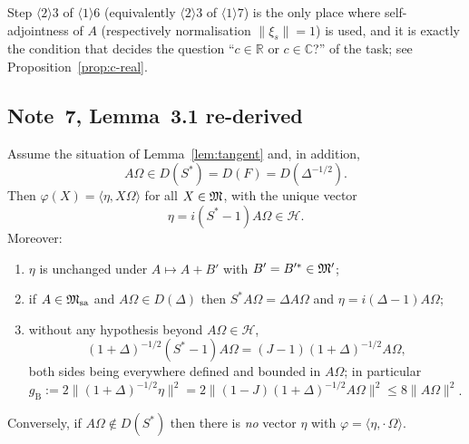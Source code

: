 \documentclass[11pt]{article}
\newcommand{\Om}{\Omega}
\newcommand{\Hil}{\mathcal H}
\newcommand{\Msa}{\cM_{\mathrm{sa}}}
\newcommand{\gB}{g_{\mathrm B}}
\newcommand{\ip}[2]{\langle #1,#2\rangle}
\newcommand{\norm}[1]{\lVert #1\rVert}
\begin{document}
\begin{remark}\label{rem:selfadj-real}
Step $\langle2\rangle3$ of $\langle1\rangle6$ (equivalently $\langle2\rangle3$ of $\langle1\rangle7$) is the only place
where self-adjointness of $A$ (respectively normalisation $\norm{\xi_s}=1$) is used, and it is exactly the condition that
decides the question ``$c\in\mathbb R$ or $c\in\mathbb C$?'' of the task; see Proposition~\ref{prop:c-real}.
\end{remark}

\subsection{Note~7, Lemma~3.1 re-derived}\label{sec:eta}

\begin{lemma}\label{lem:eta}
Assume the situation of Lemma~\ref{lem:tangent} and, in addition,
\begin{equation}\label{eq:Sdomain}
 A\Om\in D(S^*)=D(F)=D(\Delta^{-1/2}).
\end{equation}
Then $\varphi(X)=\ip{\eta}{X\Om}$ for all $X\in\mathfrak M$, with the unique vector
\begin{equation}\label{eq:eta}
 \eta=i(S^*-1)A\Om\in\Hil .
\end{equation}
Moreover:
\begin{enumerate}[leftmargin=1.7em]
\item $\eta$ is unchanged under $A\mapsto A+B'$ with $B'=B'^*\in\mathfrak M'$;
\item if $A\in\Msa$ and $A\Om\in D(\Delta)$ then $S^*A\Om=\Delta A\Om$ and $\eta=i(\Delta-1)A\Om$;
\item without any hypothesis beyond $A\Om\in\Hil$,
\begin{equation}\label{eq:gB-J}
 (1+\Delta)^{-1/2}(S^*-1)A\Om=(J-1)(1+\Delta)^{-1/2}A\Om ,
\end{equation}
both sides being everywhere defined and bounded in $A\Om$; in particular
$\gB:=2\norm{(1+\Delta)^{-1/2}\eta}^2=2\norm{(1-J)(1+\Delta)^{-1/2}A\Om}^2\le8\norm{A\Om}^2$.
\end{enumerate}
Conversely, if $A\Om\notin D(S^*)$ then there is \emph{no} vector $\eta$ with $\varphi=\ip{\eta}{\cdot\,\Om}$.
\end{lemma}
\end{document}
